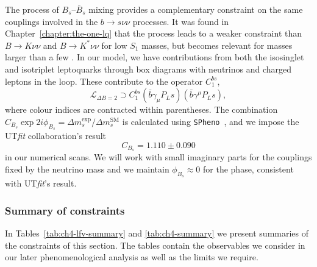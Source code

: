 The process of $B_s$--$\bar{B}_s$ mixing provides a complementary constraint on
the same couplings involved in the $b \to s \nu \nu$ processes. It was found in
Chapter~\ref{chapter:the-one-lq} that the process leads to a weaker constraint
than $B \to K \nu \nu$ and $B \to K^* \nu \nu$ for low $S_{1}$ masses, but
becomes relevant for masses larger than a few \TeV. In our model, we have
contributions from both the isosinglet and isotriplet leptoquarks through box
diagrams with neutrinos and charged leptons in the loop. These contribute to the
operator $C^{bs}_1$,
\begin{equation}
\mathcal{L}_{\Delta B = 2} \supset  C^{bs}_1 (\bar{b} \gamma_\mu P_L s)(\bar{b} \gamma^\mu P_L s),
\end{equation}
where colour indices are contracted within parentheses. The combination
$C_{B_s} \exp{2 i \phi_{B_s}} = \Delta m_s^{\text{exp}} / \Delta m_s^{\text{SM}}$
is calculated using \texttt{SPheno}~\cite{Vicente:2015zba, Porod:2003um,
  Porod:2011nf}, and we impose the UT\textit{fit} collaboration's
result~\cite{Bona:2007vi}
\begin{equation}
C_{B_s} = 1.110 \pm 0.090
\end{equation}
in our numerical scans. We will work with small imaginary parts for the
couplings fixed by the neutrino mass and we maintain $\phi_{B_s} \approx 0$ for
the phase, consistent with UT\textit{fit}'s result.

\subsubsection{Summary of constraints}

In Tables~\ref{tab:ch4-lfv-summary} and \ref{tab:ch4-summary} we present
summaries of the constraints of this section. The tables contain the observables
we consider in our later phenomenological analysis as well as the limits we
require.

